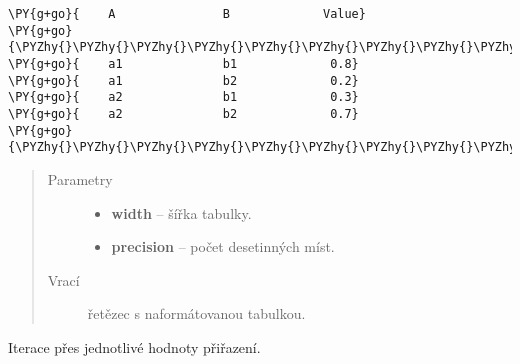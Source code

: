 \begin{fulllineitems}
\begin{fulllineitems}
\begin{Verbatim}[commandchars=\\\{\}]
\PY{g+go}{    A               B             Value}
\PY{g+go}{\PYZhy{}\PYZhy{}\PYZhy{}\PYZhy{}\PYZhy{}\PYZhy{}\PYZhy{}\PYZhy{}\PYZhy{}\PYZhy{}\PYZhy{}\PYZhy{}\PYZhy{}\PYZhy{}\PYZhy{}\PYZhy{}\PYZhy{}\PYZhy{}\PYZhy{}\PYZhy{}\PYZhy{}\PYZhy{}\PYZhy{}\PYZhy{}\PYZhy{}\PYZhy{}\PYZhy{}\PYZhy{}\PYZhy{}\PYZhy{}\PYZhy{}\PYZhy{}\PYZhy{}\PYZhy{}\PYZhy{}\PYZhy{}\PYZhy{}\PYZhy{}\PYZhy{}\PYZhy{}\PYZhy{}\PYZhy{}\PYZhy{}\PYZhy{}\PYZhy{}\PYZhy{}\PYZhy{}\PYZhy{}\PYZhy{}\PYZhy{}}
\PY{g+go}{    a1              b1             0.8}
\PY{g+go}{    a1              b2             0.2}
\PY{g+go}{    a2              b1             0.3}
\PY{g+go}{    a2              b2             0.7}
\PY{g+go}{\PYZhy{}\PYZhy{}\PYZhy{}\PYZhy{}\PYZhy{}\PYZhy{}\PYZhy{}\PYZhy{}\PYZhy{}\PYZhy{}\PYZhy{}\PYZhy{}\PYZhy{}\PYZhy{}\PYZhy{}\PYZhy{}\PYZhy{}\PYZhy{}\PYZhy{}\PYZhy{}\PYZhy{}\PYZhy{}\PYZhy{}\PYZhy{}\PYZhy{}\PYZhy{}\PYZhy{}\PYZhy{}\PYZhy{}\PYZhy{}\PYZhy{}\PYZhy{}\PYZhy{}\PYZhy{}\PYZhy{}\PYZhy{}\PYZhy{}\PYZhy{}\PYZhy{}\PYZhy{}\PYZhy{}\PYZhy{}\PYZhy{}\PYZhy{}\PYZhy{}\PYZhy{}\PYZhy{}\PYZhy{}\PYZhy{}\PYZhy{}}
\end{Verbatim}
\begin{quote}\begin{description}
\item[{Parametry}] \leavevmode\begin{itemize}
\item {} 
\textbf{width} -- šířka tabulky.

\item {} 
\textbf{precision} -- počet desetinných míst.

\end{itemize}

\item[{Vrací}] \leavevmode
řetězec s naformátovanou tabulkou.

\end{description}\end{quote}

\end{fulllineitems}


\begin{fulllineitems}
\label{alex.infer:alex.infer.factor.Factor.__iter__}
Iterace přes jednotlivé hodnoty přiřazení.


\end{fulllineitems}
\end{fulllineitems}

